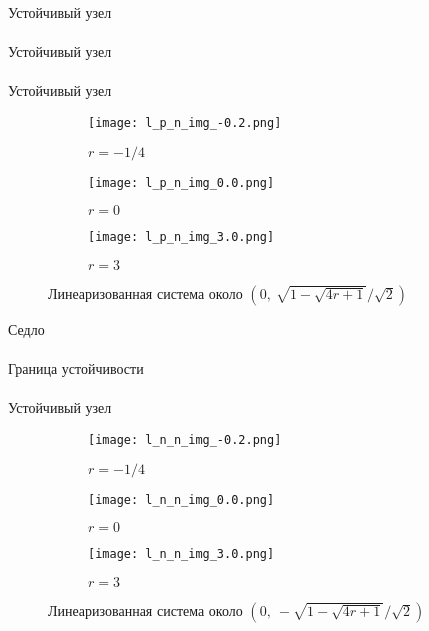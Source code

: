 \documentclass[12pt]{article}
\begin{document}
\begin{center}
    Устойчивый узел \\
    \downarrow \\
    Устойчивый узел \\
    \downarrow \\
    Устойчивый узел \\
\end{center}

\begin{figure}[H]
     \centering
     \begin{subfigure}[b]{0.3\textwidth}
         \centering
         \texttt{[image: l\_p\_n\_img\_-0.2.png]}
         \caption{$r=-1/4$}
         \label{fig:l_p_n_img_-0.2.png}
     \end{subfigure}
     \hfill
     \begin{subfigure}[b]{0.3\textwidth}
         \centering
         \texttt{[image: l\_p\_n\_img\_0.0.png]}
         \caption{$r=0$}
         \label{fig:l_p_n_img_0.0.png}
     \end{subfigure}
     \hfill
     \begin{subfigure}[b]{0.3\textwidth}
         \centering
         \texttt{[image: l\_p\_n\_img\_3.0.png]}
         \caption{$r=3$}
         \label{fig:l_p_n_img_3.0.png}
     \end{subfigure}
        \caption{Линеаризованная система около $(0,\ \sqrt{1-\sqrt{4r+1}}/\sqrt{2})$}
        \label{fig:three graphs}
\end{figure}

\begin{center}
    Седло \\
    \downarrow \\
    Граница устойчивости \\
    \downarrow \\
    Устойчивый узел \\
\end{center}

\begin{figure}[H]
     \centering
     \begin{subfigure}[b]{0.3\textwidth}
         \centering
         \texttt{[image: l\_n\_n\_img\_-0.2.png]}
         \caption{$r=-1/4$}
         \label{fig:l_n_n_img_-0.2.png}
     \end{subfigure}
     \hfill
     \begin{subfigure}[b]{0.3\textwidth}
         \centering
         \texttt{[image: l\_n\_n\_img\_0.0.png]}
         \caption{$r=0$}
         \label{fig:l_n_n_img_0.0.png}
     \end{subfigure}
     \hfill
     \begin{subfigure}[b]{0.3\textwidth}
         \centering
         \texttt{[image: l\_n\_n\_img\_3.0.png]}
         \caption{$r=3$}
         \label{fig:l_n_n_img_3.0.png}
     \end{subfigure}
        \caption{Линеаризованная система около $(0,\ -\sqrt{1-\sqrt{4r+1}}/\sqrt{2})$}
        \label{fig:three graphs}
\end{figure}
\end{document}
